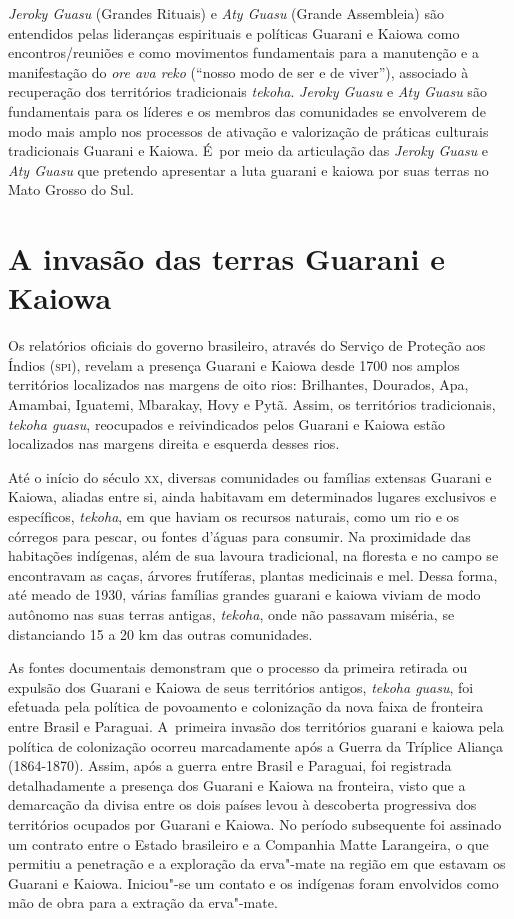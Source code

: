 \noindent
\emph{Jeroky Guasu} (Grandes Rituais) e \emph{Aty Guasu} (Grande Assembleia) são
entendidos pelas lideranças espirituais e políticas Guarani e Kaiowa
como encontros/reuniões e como movimentos fundamentais para a
manutenção e a manifestação do \emph{ore ava reko} (``nosso modo de ser e de
viver''), associado à recuperação dos territórios tradicionais \emph{tekoha}.
\emph{Jeroky Guasu} e \emph{Aty Guasu} são fundamentais para os líderes e os membros
das comunidades se envolverem de modo mais amplo nos processos de
ativação e valorização de práticas culturais tradicionais Guarani e
Kaiowa. É~por meio da articulação das \emph{Jeroky Guasu} e \emph{Aty Guasu} que
pretendo apresentar a luta guarani e kaiowa por suas terras no Mato
Grosso do Sul. 

\section{A invasão das terras Guarani e Kaiowa}

Os relatórios oficiais do governo brasileiro, através do Serviço de
Proteção aos Índios (\textsc{spi}), revelam a presença Guarani e Kaiowa desde
1700 nos amplos territórios localizados nas margens de oito rios:
Brilhantes, Dourados, Apa, Amambai, Iguatemi, Mbarakay, Hovy e Pytã.
Assim, os territórios tradicionais, \emph{tekoha guasu}, reocupados e
reivindicados pelos Guarani e Kaiowa estão localizados nas margens
direita e esquerda desses rios.

Até o início do século \textsc{xx}, diversas comunidades ou famílias extensas
Guarani e Kaiowa, aliadas entre si, ainda habitavam em determinados
lugares exclusivos e específicos, \emph{tekoha}, em que haviam os recursos
naturais, como um rio e os córregos para pescar, ou fontes d’águas para
consumir. Na proximidade das habitações indígenas, além de sua lavoura
tradicional, na floresta e no campo se encontravam as caças, árvores
frutíferas, plantas medicinais e mel. Dessa forma, até meado de 1930,
várias famílias grandes guarani e kaiowa viviam de modo autônomo nas
suas terras antigas, \emph{tekoha}, onde não passavam miséria, se distanciando
15 a 20 km das outras comunidades.

As fontes documentais demonstram que o processo da primeira retirada ou
expulsão dos Guarani e Kaiowa de seus territórios antigos, \emph{tekoha
guasu}, foi efetuada pela política de povoamento e colonização da nova
faixa de fronteira entre Brasil e Paraguai. A~primeira invasão dos
territórios guarani e kaiowa pela política de colonização ocorreu
marcadamente após a Guerra da Tríplice Aliança (1864-1870). Assim, após
a guerra entre Brasil e Paraguai, foi registrada detalhadamente a
presença dos Guarani e Kaiowa na fronteira, visto que a demarcação da
divisa entre os dois países levou à descoberta progressiva dos
territórios ocupados por Guarani e Kaiowa. No período subsequente foi
assinado um contrato entre o Estado brasileiro e a Companhia Matte
Larangeira, o que permitiu a penetração e a exploração da erva"-mate na
região em que estavam os Guarani e Kaiowa. Iniciou"-se um contato e os
indígenas foram envolvidos como mão de obra para a extração da
erva"-mate.

